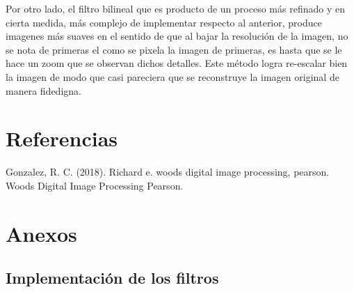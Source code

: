 \documentclass[11pt, letterpaper]{article}
\begin{document}
	Por otro lado, el filtro bilineal que es producto de un proceso más refinado y en cierta medida, más complejo de implementar respecto al anterior, produce imagenes más suaves en el sentido de que al bajar la resolución de la imagen, no se nota de primeras el como se pixela la imagen de primeras, es hasta que se le hace un zoom que se observan dichos detalles. Este método logra re-escalar bien la imagen de modo que casi pareciera que se reconstruye la imagen original de manera fidedigna.

	\newpage

	
	\section{Referencias}

	Gonzalez, R. C. (2018). Richard e. woods digital image processing, pearson. Woods Digital Image Processing Pearson.

	\newpage
	
	\section{Anexos}


	
	\subsection{Implementación de los filtros}
	
\end{document}
